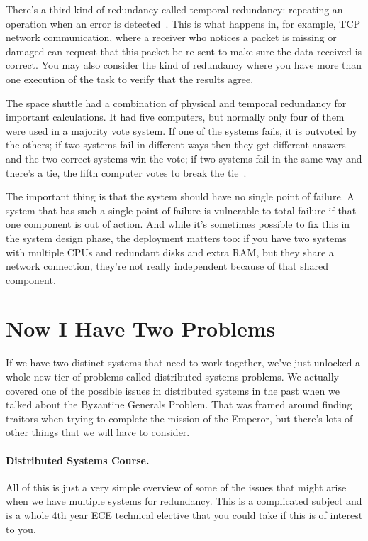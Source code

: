 There's a third kind of redundancy called temporal redundancy: repeating an operation when an error is detected~\cite{osi}. This is what happens in, for example, TCP network communication, where a receiver who notices a packet is missing or damaged can request that this packet be re-sent to make sure the data received is correct. You may also consider the kind of redundancy where you have more than one execution of the task to verify that the results agree.

The space shuttle had a combination of physical and temporal redundancy for important calculations. It had five computers, but normally only four of them were used in a majority vote system. If one of the systems fails, it is outvoted by the others; if two systems fail in different ways then they get different answers and the two correct systems win the vote; if two systems fail in the same way and there's a tie, the fifth computer votes to break the tie~\cite{mte241}.


The important thing is that the system should have no single point of failure. A system that has such a single point of failure is vulnerable to total failure if that one component is out of action. And while it's sometimes possible to fix this in the system design phase, the deployment matters too: if you have two systems with multiple CPUs and redundant disks and extra RAM, but they share a network connection, they're not really independent because of that shared component.

\section*{Now I Have Two Problems}
If we have two distinct systems that need to work together, we've just unlocked a whole new tier of problems called distributed systems problems. We actually covered one of the possible issues in distributed systems in the past when we talked about the Byzantine Generals Problem. That was framed around finding traitors when trying to complete the mission of the Emperor, but there's lots of other things that we will have to consider.

\paragraph{Distributed Systems Course.}
All of this is just a very simple overview of some of the issues that might arise when we have multiple systems for redundancy. This is a complicated subject and is a whole 4th year ECE technical elective that you could take if this is of interest to you. 



